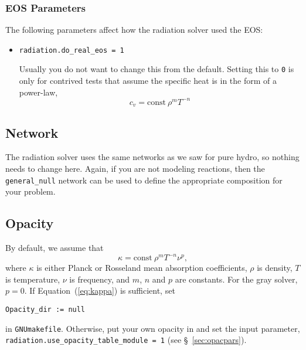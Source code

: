 \subsubsection{EOS Parameters}

The following parameters affect how the radiation solver used the EOS:
\begin{itemize}
  \item {\tt radiation.do\_real\_eos = 1}

    Usually you do not want to change this from the default.  Setting
    this to {\tt 0} is only for contrived tests that assume the
    specific heat is in the form of a power-law,
    \begin{equation}
      c_v = \mathrm{const}\ \rho^m T^{-n}
    \end{equation}

\end{itemize}
  
  

\subsection{Network}

The radiation solver uses the same networks as we saw for pure hydro,
so nothing needs to change here.  Again, if you are not modeling
reactions, then the {\tt general\_null} network can be used to define
the appropriate composition for your problem.

\subsection{Opacity}

By default, we assume that
\begin{equation}
  \kappa = \mathrm{const}\ \rho^{m} T^{-n} \nu^{p} , \label{eq:kappa}
\end{equation}
where $\kappa$ is either Planck or Rosseland mean absorption
coefficients, $\rho$ is density, $T$ is temperature, $\nu$ is
frequency, and $m$, $n$ and $p$ are constants.  For the gray solver,
$p = 0$.  If Equation~(\ref{eq:kappa}) is sufficient, set
\begin{verbatim}
Opacity_dir := null
\end{verbatim}
in {\tt GNUmakefile}.  Otherwise, put your own opacity in
{\tt{}} and set
the input parameter, {\tt radiation.use\_opacity\_table\_module = 1} (see
\S~\ref{sec:opacpars}).

